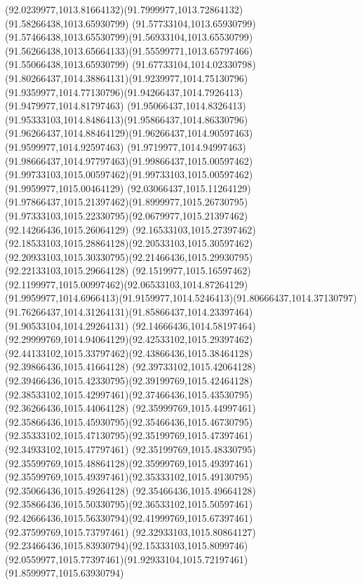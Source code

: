 {    \curveto(92.0239977,1013.81664132)(91.7999977,1013.72864132)(91.58266438,1013.65930799)
    \curveto(91.57733104,1013.65930799)(91.57466438,1013.65530799)(91.56933104,1013.65530799)
    \curveto(91.56266438,1013.65664133)(91.55599771,1013.65797466)(91.55066438,1013.65930799)
    \curveto(91.67733104,1014.02330798)(91.80266437,1014.38864131)(91.9239977,1014.75130796)
    \curveto(91.9359977,1014.77130796)(91.94266437,1014.7926413)(91.9479977,1014.81797463)
    \curveto(91.95066437,1014.8326413)(91.95333103,1014.8486413)(91.95866437,1014.86330796)
    \curveto(91.96266437,1014.88464129)(91.96266437,1014.90597463)(91.9599977,1014.92597463)
    \curveto(91.9719977,1014.94997463)(91.98666437,1014.97797463)(91.99866437,1015.00597462)
    \curveto(91.99733103,1015.00597462)(91.99733103,1015.00597462)(91.9959977,1015.00464129)
    \curveto(92.03066437,1015.11264129)(91.97866437,1015.21397462)(91.8999977,1015.26730795)
    \curveto(91.97333103,1015.22330795)(92.0679977,1015.21397462)(92.14266436,1015.26064129)
    \curveto(92.16533103,1015.27397462)(92.18533103,1015.28864128)(92.20533103,1015.30597462)
    \curveto(92.20933103,1015.30330795)(92.21466436,1015.29930795)(92.22133103,1015.29664128)
    \curveto(92.1519977,1015.16597462)(92.1199977,1015.00997462)(92.06533103,1014.87264129)
    \curveto(91.9959977,1014.6966413)(91.9159977,1014.5246413)(91.80666437,1014.37130797)
    \curveto(91.76266437,1014.31264131)(91.85866437,1014.23397464)(91.90533104,1014.29264131)
    \curveto(92.14666436,1014.58197464)(92.29999769,1014.94064129)(92.42533102,1015.29397462)
    \curveto(92.44133102,1015.33797462)(92.43866436,1015.38464128)(92.39866436,1015.41664128)
    \curveto(92.39733102,1015.42064128)(92.39466436,1015.42330795)(92.39199769,1015.42464128)
    \curveto(92.38533102,1015.42997461)(92.37466436,1015.43530795)(92.36266436,1015.44064128)
    \curveto(92.35999769,1015.44997461)(92.35866436,1015.45930795)(92.35466436,1015.46730795)
    \curveto(92.35333102,1015.47130795)(92.35199769,1015.47397461)(92.34933102,1015.47797461)
    \curveto(92.35199769,1015.48330795)(92.35599769,1015.48864128)(92.35999769,1015.49397461)
    \curveto(92.35599769,1015.49397461)(92.35333102,1015.49130795)(92.35066436,1015.49264128)
    \curveto(92.35466436,1015.49664128)(92.35866436,1015.50330795)(92.36533102,1015.50597461)
    \curveto(92.42666436,1015.56330794)(92.41999769,1015.67397461)(92.37599769,1015.73797461)
    \curveto(92.32933103,1015.80864127)(92.23466436,1015.83930794)(92.15333103,1015.8099746)
    \curveto(92.0559977,1015.77397461)(91.92933104,1015.72197461)(91.8599977,1015.63930794)
}
